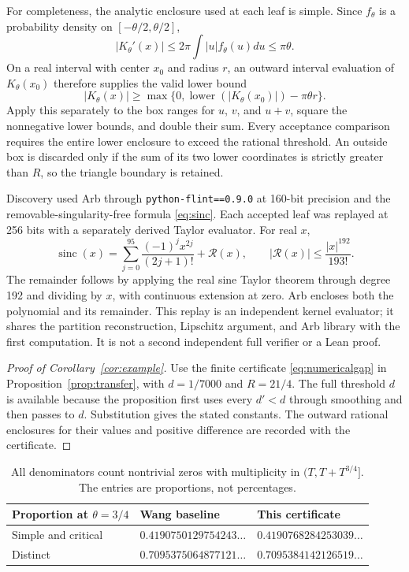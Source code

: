 \documentclass[11pt]{article}
\theoremstyle{remark}
\begin{document}
For completeness, the analytic enclosure used at each leaf is simple.
Since $f_\theta$ is a probability density on $[-\theta/2,\theta/2]$,
\begin{equation}\label{eq:lipschitz}
 |K_\theta'(x)|\le2\pi\int|u|f_\theta(u)du\le\pi\theta.
\end{equation}
On a real interval with center $x_0$ and radius $r$, an outward interval
evaluation of $K_\theta(x_0)$ therefore supplies the valid lower bound
\[
 |K_\theta(x)|\ge
 \max\{0,\operatorname{lower}(|K_\theta(x_0)|)-\pi\theta r\}.
\]
Apply this separately to the box ranges for $u$, $v$, and $u+v$, square
the nonnegative lower bounds, and double their sum. Every acceptance
comparison requires the entire lower enclosure to exceed the rational
threshold. An outside box is discarded only if the sum of its two lower
coordinates is strictly greater than $R$, so the triangle boundary is
retained.

Discovery used Arb through \texttt{python-flint==0.9.0} at 160-bit
precision and the removable-singularity-free formula \eqref{eq:sinc}.
Each accepted leaf was replayed at 256 bits with a separately derived
Taylor evaluator. For real $x$,
\begin{equation}\label{eq:taylor}
 \operatorname{sinc}(x)=\sum_{j=0}^{95}\frac{(-1)^jx^{2j}}{(2j+1)!}
 +\mathcal R(x),\qquad
 |\mathcal R(x)|\le\frac{|x|^{192}}{193!}.
\end{equation}
The remainder follows by applying the real sine Taylor theorem through
degree 192 and dividing by $x$, with continuous extension at zero.
Arb encloses both the polynomial and its remainder. This replay is an
independent kernel evaluator; it shares the partition reconstruction,
Lipschitz argument, and Arb library with the first computation. It is
not a second independent full verifier or a Lean proof.

\begin{proof}[Proof of Corollary~\ref{cor:example}]
Use the finite certificate \eqref{eq:numericalgap} in
Proposition~\ref{prop:transfer}, with $d=1/7000$ and $R=21/4$.
The full threshold $d$ is available because the proposition first uses
every $d'<d$ through smoothing and then passes to $d$. Substitution
gives the stated constants. The outward rational enclosures for their
values and positive difference are recorded with the certificate.
\end{proof}

\begin{table}[ht]
\centering
\begin{tabular}{@{}lll@{}}
\toprule
Proportion at $\theta=3/4$ & Wang baseline & This certificate\\
\midrule
Simple and critical & $0.4190750129754243\ldots$ & $0.4190768284253039\ldots$\\
Distinct & $0.7095375064877121\ldots$ & $0.7095384142126519\ldots$\\
\bottomrule
\end{tabular}
\caption{All denominators count nontrivial zeros with multiplicity in
$(T,T+T^{3/4}]$. The entries are proportions, not percentages.}
\end{table}
\end{document}
